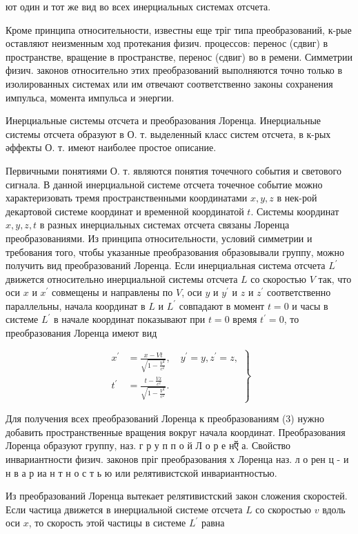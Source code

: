 \documentclass[10pt]{article}
\begin{document}
ют один и тот же вид во всех инерциальных системах отсчета.

Кроме принципа относительности, известны еще тріг типа преобразований, к-рые оставляют неизменным ход протекания физич. процессов: перенос (сдвиг) в пространстве, вращение в пространстве, перенос (сдвиг) во в ремени. Симметрии физич. законов относительно этих преобразований выполняются точно только в изолированных системах или им отвечают соответственно законы сохранения импульса, момента импульса и энергии.

Инерциальные системы отсчета и преобразования Лоренца. Инерциальные системы отсчета образуют в О. т. выделенный класс систем отсчета, в к-рых әффекты О. т. имеют наиболее простое описание.

Первичными понятиями О. т. являются понятия точечного события и светового сигнала. В данной инерциальной системе отсчета точечное событие можно характеризовать тремя пространственными координатами $x, y, z$ в нек-рой декартовой системе координат и временной координатой $t$. Системы координат $x, y, z, t$ в разных инерциальных системах отсчета связаны Лоренца преобразованиями. Из принципа относительности, условий симметрии и требования того, чтобы указанные преобразования образовывали группу, можно получить вид преобразований Лоренца. Если инерциальная система отсчета $L^{\prime}$ движется относительно инерциальной системы отсчета $L$ со скоростью $V$ так, что оси $x$ и $x^{\prime}$ совмещены и направлены по $V$, оси $y$ и $y^{\prime}$ и $z$ и $z^{\prime}$ соответственно параллельны, начала координат в $L$ и $L^{\prime}$ совпадают в момент $t=0$ и часы в системе $L^{\prime}$ в начале координат показывают при $t=0$ время $t^{\prime}=0$, то преобразования Лоренца имеют вид

\[
\left.\begin{array}{rl}
x^{\prime} & =\frac{x-V t}{\sqrt{1-\frac{V^{2}}{c^{2}}}}, \quad y^{\prime}=y, z^{\prime}=z, \\
t^{\prime} & =\frac{t-\frac{V x}{c^{2}}}{\sqrt{1-\frac{V^{2}}{c^{2}}}} .
\end{array}\right\}
\]

Для получения всех преобразований Лоренца к преобразованиям (3) нужно добавить пространственные вращения вокруг начала координат. Преобразования Лоренца образуют группу, наз. г р у п п о й Л о р е нऍ а. Свойство инвариантности физич. законов пріг преобразования х Лоренца наз. л о рен ц - и н в а р иа н т н о с т ь ю или релятивистской инвариантностью.

Из преобразований Лоренца вытекает релятивистский закон сложения скоростей. Если частица движется в инерциальной системе отсчета $L$ со скоростью $v$ вдоль оси $x$, то скорость этой частицы в системе $L^{\prime}$ равна
\end{document}
